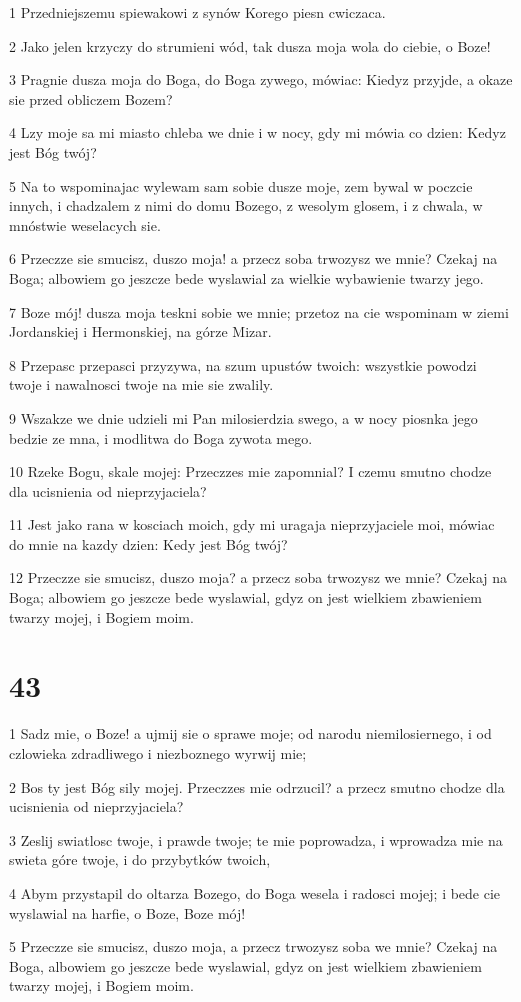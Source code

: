 \par 1 Przedniejszemu spiewakowi z synów Korego piesn cwiczaca.
\par 2 Jako jelen krzyczy do strumieni wód, tak dusza moja wola do ciebie, o Boze!
\par 3 Pragnie dusza moja do Boga, do Boga zywego, mówiac: Kiedyz przyjde, a okaze sie przed obliczem Bozem?
\par 4 Lzy moje sa mi miasto chleba we dnie i w nocy, gdy mi mówia co dzien: Kedyz jest Bóg twój?
\par 5 Na to wspominajac wylewam sam sobie dusze moje, zem bywal w poczcie innych, i chadzalem z nimi do domu Bozego, z wesolym glosem, i z chwala, w mnóstwie weselacych sie.
\par 6 Przeczze sie smucisz, duszo moja! a przecz soba trwozysz we mnie? Czekaj na Boga; albowiem go jeszcze bede wyslawial za wielkie wybawienie twarzy jego.
\par 7 Boze mój! dusza moja teskni sobie we mnie; przetoz na cie wspominam w ziemi Jordanskiej i Hermonskiej, na górze Mizar.
\par 8 Przepasc przepasci przyzywa, na szum upustów twoich: wszystkie powodzi twoje i nawalnosci twoje na mie sie zwalily.
\par 9 Wszakze we dnie udzieli mi Pan milosierdzia swego, a w nocy piosnka jego bedzie ze mna, i modlitwa do Boga zywota mego.
\par 10 Rzeke Bogu, skale mojej: Przeczzes mie zapomnial? I czemu smutno chodze dla ucisnienia od nieprzyjaciela?
\par 11 Jest jako rana w kosciach moich, gdy mi uragaja nieprzyjaciele moi, mówiac do mnie na kazdy dzien: Kedy jest Bóg twój?
\par 12 Przeczze sie smucisz, duszo moja? a przecz soba trwozysz we mnie? Czekaj na Boga; albowiem go jeszcze bede wyslawial, gdyz on jest wielkiem zbawieniem twarzy mojej, i Bogiem moim.

\chapter{43}

\par 1 Sadz mie, o Boze! a ujmij sie o sprawe moje; od narodu niemilosiernego, i od czlowieka zdradliwego i niezboznego wyrwij mie;
\par 2 Bos ty jest Bóg sily mojej. Przeczzes mie odrzucil? a przecz smutno chodze dla ucisnienia od nieprzyjaciela?
\par 3 Zeslij swiatlosc twoje, i prawde twoje; te mie poprowadza, i wprowadza mie na swieta góre twoje, i do przybytków twoich,
\par 4 Abym przystapil do oltarza Bozego, do Boga wesela i radosci mojej; i bede cie wyslawial na harfie, o Boze, Boze mój!
\par 5 Przeczze sie smucisz, duszo moja, a przecz trwozysz soba we mnie? Czekaj na Boga, albowiem go jeszcze bede wyslawial, gdyz on jest wielkiem zbawieniem twarzy mojej, i Bogiem moim.

